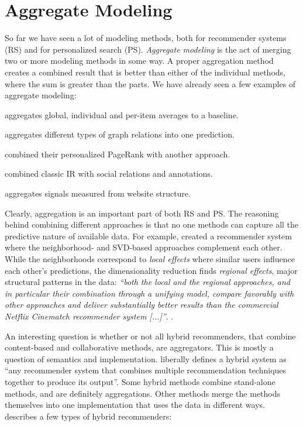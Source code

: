 \section{Aggregate Modeling}
\label{sec:aggregate}

So far we have seen a lot of modeling methods, both for recommender systems (RS) and for personalized search (PS).
\emph{Aggregate modeling} is the act of merging two or more modeling methods in some way.
A proper aggregation method creates a combined result that is better than either of the individual methods,
where the sum is greater than the parts.
We have already seen a few examples of aggregate modeling:

\begin{itemize*}
  \item \cite{Koren2008} aggregates global, individual and per-item averages to a baseline.
  \item \cite{Huang2002} aggregates different types of graph relations into one prediction.
  \item \citet{Haveliwala2003} combined their personalized PageRank with another approach.
  \item \cite{Carmel2009} combined classic IR with social relations and annotations.
  \item \citet[p5]{Bender2005} aggregates signals measured from website structure.
\end{itemize*}

Clearly, aggregation is an important part of both RS and PS.
The reasoning behind combining different approaches is that no one methods
can capture all the predictive nature of available data.
For example, 
\cite{Bell2007b} created a recommender system where the neighborhood- and SVD-based approaches complement each other.
While the neighborhoods correspond to \emph{local effects} where similar users influence each other's predictions,
the dimensionality reduction finds \emph{regional effects}, major structural patterns in the data:
\emph{``both the local and the regional approaches, and in particular their combination through a unifying model, 
compare favorably with other approaches and deliver substantially better results than the 
commercial Netflix Cinematch recommender system [...]''}.
\cite{Bell2007b}.

An interesting question is whether or not all hybrid recommenders,
that combine content-based and collaborative methods, are aggregators. 
This is mostly a question of semantics and implementation.
\citet[p4]{Burke2007} liberally defines a hybrid system as 
``any recommender system that combines multiple recommendation techniques together to produce its output''.
Some hybrid methods combine stand-alone methods, and are definitely aggregations.
Other methods merge the methods themselves into one implementation that uses the data in different ways.
\citeauthor{Burke2007} describes a few types of hybrid recommenders:


